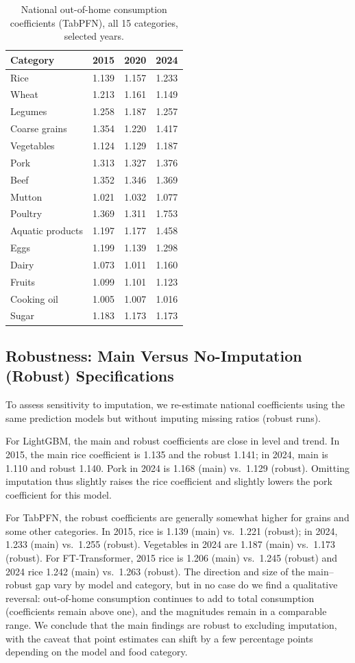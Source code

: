 \documentclass[12pt,a4paper]{article}
\begin{document}
\begin{table}[htbp]
\centering
\caption{National out-of-home consumption coefficients (TabPFN), all 15 categories, selected years.}
\label{tab:national_coef_full}
\small
\begin{tabular}{lccc}
\toprule
Category & 2015 & 2020 & 2024 \\
\midrule
Rice & 1.139 & 1.157 & 1.233 \\
Wheat & 1.213 & 1.161 & 1.149 \\
Legumes & 1.258 & 1.187 & 1.257 \\
Coarse grains & 1.354 & 1.220 & 1.417 \\
Vegetables & 1.124 & 1.129 & 1.187 \\
Pork & 1.313 & 1.327 & 1.376 \\
Beef & 1.352 & 1.346 & 1.369 \\
Mutton & 1.021 & 1.032 & 1.077 \\
Poultry & 1.369 & 1.311 & 1.753 \\
Aquatic products & 1.197 & 1.177 & 1.458 \\
Eggs & 1.199 & 1.139 & 1.298 \\
Dairy & 1.073 & 1.011 & 1.160 \\
Fruits & 1.099 & 1.101 & 1.123 \\
Cooking oil & 1.005 & 1.007 & 1.016 \\
Sugar & 1.183 & 1.173 & 1.173 \\
\bottomrule
\end{tabular}
\end{table}

\subsection{Robustness: Main Versus No-Imputation (Robust) Specifications}

To assess sensitivity to imputation, we re-estimate national coefficients using the same prediction models but without imputing missing ratios (robust runs).

For LightGBM, the main and robust coefficients are close in level and trend. In 2015, the main rice coefficient is 1.135 and the robust 1.141; in 2024, main is 1.110 and robust 1.140. Pork in 2024 is 1.168 (main) vs.\ 1.129 (robust). Omitting imputation thus slightly raises the rice coefficient and slightly lowers the pork coefficient for this model.

For TabPFN, the robust coefficients are generally somewhat higher for grains and some other categories. In 2015, rice is 1.139 (main) vs.\ 1.221 (robust); in 2024, 1.233 (main) vs.\ 1.255 (robust). Vegetables in 2024 are 1.187 (main) vs.\ 1.173 (robust). For FT-Transformer, 2015 rice is 1.206 (main) vs.\ 1.245 (robust) and 2024 rice 1.242 (main) vs.\ 1.263 (robust). The direction and size of the main--robust gap vary by model and category, but in no case do we find a qualitative reversal: out-of-home consumption continues to add to total consumption (coefficients remain above one), and the magnitudes remain in a comparable range. We conclude that the main findings are robust to excluding imputation, with the caveat that point estimates can shift by a few percentage points depending on the model and food category.
\end{document}
